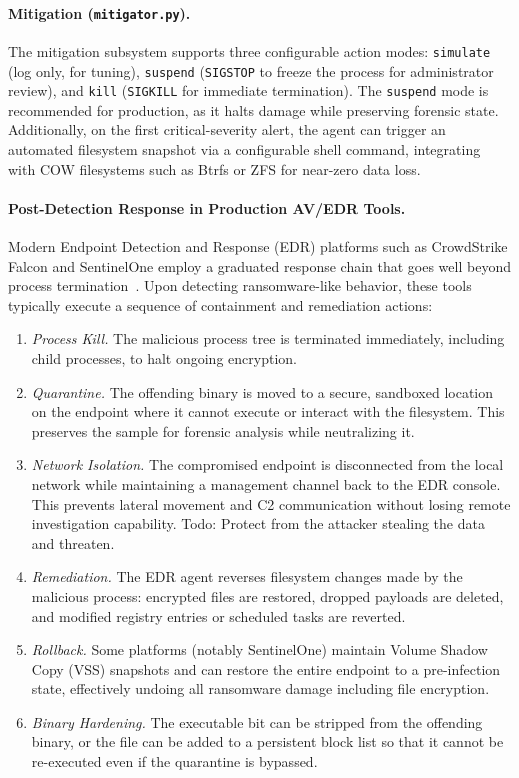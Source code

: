 \documentclass[twocolumn, 10pt]{scrartcl}
\newcommand{\todo}[1]{{\color{red} Todo: #1}}
\begin{document}
\paragraph{Mitigation (\texttt{mitigator.py}).}
The mitigation subsystem supports three configurable action modes: \texttt{simulate} (log only, for tuning), \texttt{suspend} (\texttt{SIGSTOP} to freeze the process for administrator review), and \texttt{kill} (\texttt{SIGKILL} for immediate termination). The \texttt{suspend} mode is recommended for production, as it halts damage while preserving forensic state. Additionally, on the first critical-severity alert, the agent can trigger an automated filesystem snapshot via a configurable shell command, integrating with COW filesystems such as Btrfs or ZFS for near-zero data loss.

\paragraph{Post-Detection Response in Production AV/EDR Tools.}
Modern Endpoint Detection and Response (EDR) platforms such as CrowdStrike Falcon and SentinelOne employ a graduated response chain that goes well beyond process termination~\cite{cybervigilance_s1}. Upon detecting ransomware-like behavior, these tools typically execute a sequence of containment and remediation actions:

\begin{enumerate}
    \item \textit{Process Kill.} The malicious process tree is terminated immediately, including child processes, to halt ongoing encryption.
    \item \textit{Quarantine.} The offending binary is moved to a secure, sandboxed location on the endpoint where it cannot execute or interact with the filesystem. This preserves the sample for forensic analysis while neutralizing it.
    \item \textit{Network Isolation.} The compromised endpoint is disconnected from the local network while maintaining a management channel back to the EDR console. This prevents lateral movement and C2 communication without losing remote investigation capability. \todo{Protect from the attacker stealing the data and threaten.}
    \item \textit{Remediation.} The EDR agent reverses filesystem changes made by the malicious process: encrypted files are restored, dropped payloads are deleted, and modified registry entries or scheduled tasks are reverted.
    \item \textit{Rollback.} Some platforms (notably SentinelOne) maintain Volume Shadow Copy (VSS) snapshots and can restore the entire endpoint to a pre-infection state, effectively undoing all ransomware damage including file encryption.
    \item \textit{Binary Hardening.} The executable bit can be stripped from the offending binary, or the file can be added to a persistent block list so that it cannot be re-executed even if the quarantine is bypassed.
\end{enumerate}
\end{document}
